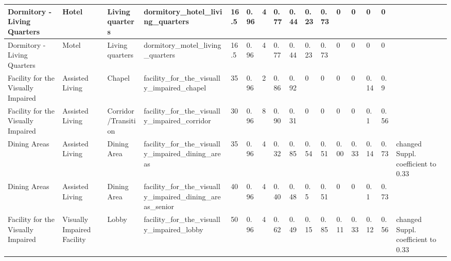 \begin{center}
\begin{landscape}
\begin{longtable}{|p{0.75in}|p{0.75in}|p{0.75in}|p{0.75in}|p{0.3in}|p{0.3in}|p{0.3in}|p{0.3in}|p{0.3in}|p{0.3in}|p{0.3in}|p{0.3in}|p{0.3in}|p{0.3in}|p{0.3in}|p{0.6in}|}
      Dormitory - Living Quarters             & Hotel                       & Living quarters                                 & dormitory\_hotel\_living\_quarters                              & 16.5 & 0.96 & 4  & 0.77   & 0.44  & 0.23  & 0.73  & 0    & 0    & 0    & 0    &                                                                                       \\ \hline
      Dormitory - Living Quarters             & Motel                       & Living quarters                                 & dormitory\_motel\_living\_quarters                              & 16.5 & 0.96 & 4  & 0.77   & 0.44  & 0.23  & 0.73  & 0    & 0    & 0    & 0    &                                                                                       \\ \hline
      Facility for the Visually Impaired      & Assisted Living             & Chapel                                          & facility\_for\_the\_visually\_impaired\_chapel                  & 35   & 0.96 & 2  & 0.86   & 0.92  & 0     & 0     & 0    & 0    & 0.14 & 0.9  &                                                                                       \\ \hline
      Facility for the Visually Impaired      & Assisted Living             & Corridor/Transition                             & facility\_for\_the\_visually\_impaired\_corridor                & 30   & 0.96 & 8  & 0.90   & 0.31  & 0     & 0     & 0    & 0    & 0.1  & 0.56 &                                                                                       \\ \hline
      Dining Areas                            & Assisted Living             & Dining Area                                     & facility\_for\_the\_visually\_impaired\_dining\_areas           & 35   & 0.96 & 4  & 0.32   & 0.85  & 0.54  & 0.51  & 0.00 & 0.33 & 0.14 & 0.73 & changed Suppl. coefficient to 0.33                                              \\ \hline
      Dining Areas                            & Assisted Living             & Dining Area                                     & facility\_for\_the\_visually\_impaired\_dining\_areas\_senior   & 40   & 0.96 & 4  & 0.40   & 0.48  & 0.5   & 0.51  & 0    & 0    & 0.1  & 0.73 &                                                                                       \\ \hline
      Facility for the Visually Impaired      & Visually Impaired Facility  & Lobby                                           & facility\_for\_the\_visually\_impaired\_lobby                   & 50   & 0.96 & 4  & 0.62   & 0.49  & 0.15  & 0.85  & 0.11 & 0.33 & 0.12 & 0.56 & changed Suppl. coefficient to 0.33                                              \\ \hline

\end{longtable}
\end{landscape}
\end{center}
